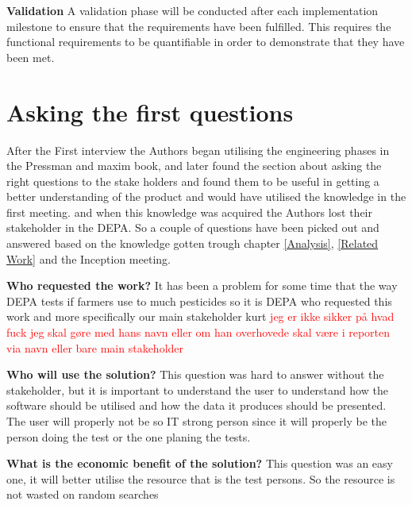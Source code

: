 \textbf{Validation} A validation phase will be conducted after each implementation milestone to ensure that the requirements have been fulfilled. This requires the functional requirements to be quantifiable in order to demonstrate that they have been met.

\section{Asking the first questions}
\label{SE_FirstQuestions}
After the First interview the Authors began utilising the engineering phases in the Pressman and maxim book\cite{pressman2019software}, and later found the section about asking the right questions to the stake holders and found them to be useful in getting a better understanding of the product and would have utilised the knowledge in the first meeting. and when this knowledge was acquired the Authors lost their stakeholder in the \acrshort{DEPA}. So a couple of questions have been picked out and answered based on the knowledge gotten trough chapter \ref{Analysis}, \ref{Related Work} and the Inception meeting.


\textbf{Who requested the work?} It has been a problem for some time that the way \acrshort{DEPA} tests if farmers use to much pesticides so it is \acrshort{DEPA} who requested this work and more specifically our main stakeholder kurt \textcolor{red}{jeg er ikke sikker på hvad fuck jeg skal gøre med hans navn eller om han overhovede skal være i reporten via navn eller bare main stakeholder} 

\textbf{Who will use the solution?} This question was hard to answer without the stakeholder, but it is important to understand the user to understand how the software should be utilised and how the data it produces should be presented. The user will properly not be so IT strong person since it will properly be the person doing the test or the one planing the tests. 

\textbf{What is the economic benefit of the solution?} This question was an easy one, it will better utilise the resource that is the test persons. So the resource is not wasted on random searches 

